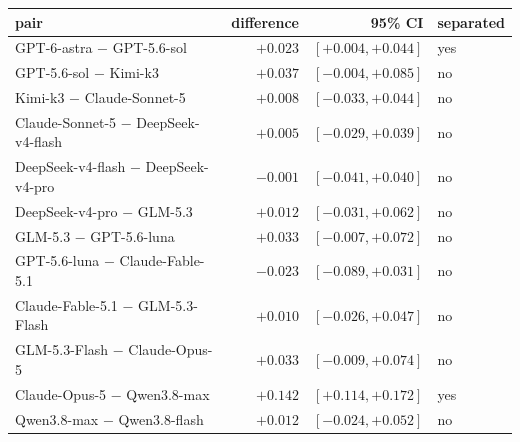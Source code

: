 \begin{tabular}{@{}lrrl@{}}
\toprule
pair & difference & 95\% CI & separated \\
\midrule
GPT-6-astra $-$ GPT-5.6-sol & $+0.023$ & $[+0.004, +0.044]$ & yes \\
GPT-5.6-sol $-$ Kimi-k3 & $+0.037$ & $[-0.004, +0.085]$ & no \\
Kimi-k3 $-$ Claude-Sonnet-5 & $+0.008$ & $[-0.033, +0.044]$ & no \\
Claude-Sonnet-5 $-$ DeepSeek-v4-flash & $+0.005$ & $[-0.029, +0.039]$ & no \\
DeepSeek-v4-flash $-$ DeepSeek-v4-pro & $-0.001$ & $[-0.041, +0.040]$ & no \\
DeepSeek-v4-pro $-$ GLM-5.3 & $+0.012$ & $[-0.031, +0.062]$ & no \\
GLM-5.3 $-$ GPT-5.6-luna & $+0.033$ & $[-0.007, +0.072]$ & no \\
GPT-5.6-luna $-$ Claude-Fable-5.1 & $-0.023$ & $[-0.089, +0.031]$ & no \\
Claude-Fable-5.1 $-$ GLM-5.3-Flash & $+0.010$ & $[-0.026, +0.047]$ & no \\
GLM-5.3-Flash $-$ Claude-Opus-5 & $+0.033$ & $[-0.009, +0.074]$ & no \\
Claude-Opus-5 $-$ Qwen3.8-max & $+0.142$ & $[+0.114, +0.172]$ & yes \\
Qwen3.8-max $-$ Qwen3.8-flash & $+0.012$ & $[-0.024, +0.052]$ & no \\
\bottomrule
\end{tabular}
